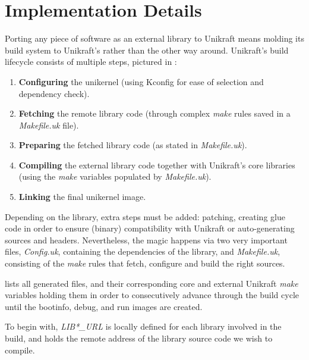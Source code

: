 \chapter{Implementation Details}
\label{chapter:implementation-details}

Porting any piece of software as an external library to Unikraft means molding its build system to Unikraft's rather than the other way around.
Unikraft's build lifecycle consists of multiple steps, pictured in :

\begin{enumerate}
    \item \textbf{Configuring} the unikernel (using Kconfig \cite{kconfig} for ease of selection and dependency check).
    \item \textbf{Fetching} the remote library code (through complex \textit{make} rules saved in a \textit{Makefile.uk} file).
    \item \textbf{Preparing} the fetched library code (as stated in \textit{Makefile.uk}).
    \item \textbf{Compiling} the external library code together with Unikraft's core libraries (using the \textit{make} variables populated by \textit{Makefile.uk}).
    \item \textbf{Linking} the final unikernel image.
\end{enumerate}

Depending on the library, extra steps must be added: patching, creating glue code in order to ensure (binary) compatibility with Unikraft or auto-generating sources and headers.
Nevertheless, the magic happens via two very important files, \textit{Config.uk}, containing the dependencies of the library, and \textit{Makefile.uk}, consisting of the \textit{make} rules that fetch, configure and build the right sources.



 lists all generated files, and their corresponding core and external Unikraft \textit{make} variables holding them in order to consecutively advance through the build cycle until the bootinfo, debug, and run images are created.

To begin with, \textit{LIB*_URL} is locally defined for each library involved in the build, and holds the remote address of the library source code we wish to compile.

